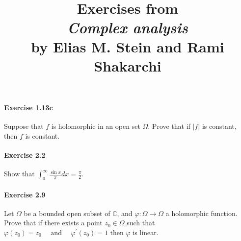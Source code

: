 \documentclass{article}
\title{\textbf{
Exercises from \\
\textit{Complex analysis} \\
by Elias M. Stein and Rami Shakarchi
}}
\date{}
\begin{document}
\maketitle

\paragraph{Exercise 1.13c} Suppose that $f$ is holomorphic in an open set $\Omega$. Prove that if $|f|$ is constant, then $f$ is constant.

\paragraph{Exercise 2.2} Show that $\int_{0}^{\infty} \frac{\sin x}{x} d x=\frac{\pi}{2}$.

\paragraph{Exercise 2.9} Let $\Omega$ be a bounded open subset of $\mathbb{C}$, and $\varphi: \Omega \rightarrow \Omega$ a holomorphic function. Prove that if there exists a point $z_{0} \in \Omega$ such that $\varphi\left(z_{0}\right)=z_{0} \quad \text { and } \quad \varphi^{\prime}\left(z_{0}\right)=1$ then $\varphi$ is linear.
\end{document}
